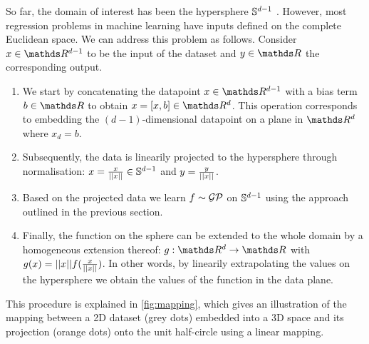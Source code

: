 So far, the domain of interest has been the hypersphere $\mathbb{S}^{d-1}$ . However, most regression problems in machine learning have inputs defined on the complete Euclidean space. We can address this problem as follows. Consider $x \in \Reals^{d-1}$ to be the input of the dataset and $y \in \Reals$ the corresponding output.
\begin{enumerate}
    \item We start by concatenating the datapoint $x \in \Reals^{d-1}$ with a bias term $b \in \Reals$ to obtain $x = [x, b] \in \Reals^d$. This operation corresponds to embedding the $(d\!-\!1)$-dimensional datapoint on a plane in $\Reals^d$ where $x_d = b$.
    \item Subsequently, the data is linearily projected to the hypersphere through normalisation: $x = {x \over \lvert\lvert x\rvert\rvert} \in \mathbb{S}^{d-1}$ and $y = {y \over \lvert\lvert x\rvert\rvert}$.
    \item Based on the projected data we learn $f \sim \mathcal{GP}$ on $\mathbb{S}^{d-1}$ using the approach outlined in the previous section.
    \item Finally, the function on the sphere can be extended to the whole domain by a homogeneous extension thereof: $g: \Reals^d \rightarrow \Reals$ with $g(x) = \lvert\lvert x\rvert\rvert f({x \over \lvert\lvert x\rvert\rvert})$. In other words, by linearily extrapolating the values on the hypersphere we obtain the values of the function in the data plane.
\end{enumerate}
This procedure is explained in \cref{fig:mapping}, which gives an illustration of the mapping between a 2D dataset (grey dots) embedded into a 3D space and its projection (orange dots) onto the unit half-circle using a linear mapping.

